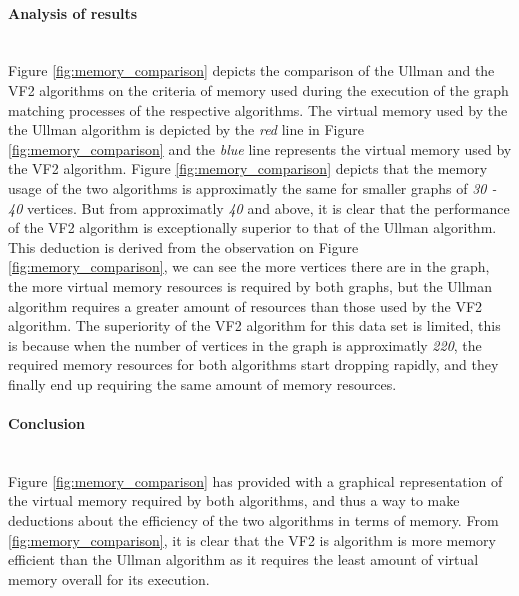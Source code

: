 \paragraph{Analysis of results}\mbox{}\\
Figure \ref{fig:memory_comparison} depicts the comparison of the Ullman and the VF2 algorithms on the criteria of memory used during the execution of the graph matching processes
of the respective algorithms.\newline\newline
The virtual memory used by the the Ullman algorithm is depicted by the \textit{red} line in Figure \ref{fig:memory_comparison} and the \textit{blue} line
represents the virtual memory used by the VF2 algorithm.\newline\newline
Figure \ref{fig:memory_comparison} depicts that the memory usage of the two algorithms is approximatly the same for smaller graphs of \textit{30 - 40} 
vertices. But from approximatly \textit{40} and above, it is clear that the performance of the VF2 algorithm is exceptionally superior to that of the 
Ullman algorithm. This deduction is derived from the observation on Figure \ref{fig:memory_comparison}, we can see the more vertices there are in 
the graph, the more virtual memory resources is required by both graphs, but the Ullman algorithm requires a greater amount of resources than those 
used by the VF2 algorithm.\newline\newline
The superiority of the VF2 algorithm for this data set is limited, this is because when the number of vertices in the graph is approximatly \textit{220}, 
the required memory resources for both algorithms start dropping rapidly, and they finally end up requiring the same amount of memory resources.

\paragraph{Conclusion}\mbox{}\\
Figure \ref{fig:memory_comparison} has provided with a graphical representation of the virtual memory required by both algorithms, and thus a way to
make deductions about the efficiency of the two algorithms in terms of memory.\newline\newline
From \ref{fig:memory_comparison}, it is clear that the VF2 is algorithm is more memory efficient than the Ullman algorithm as it requires the least amount 
of virtual memory overall for its execution.

